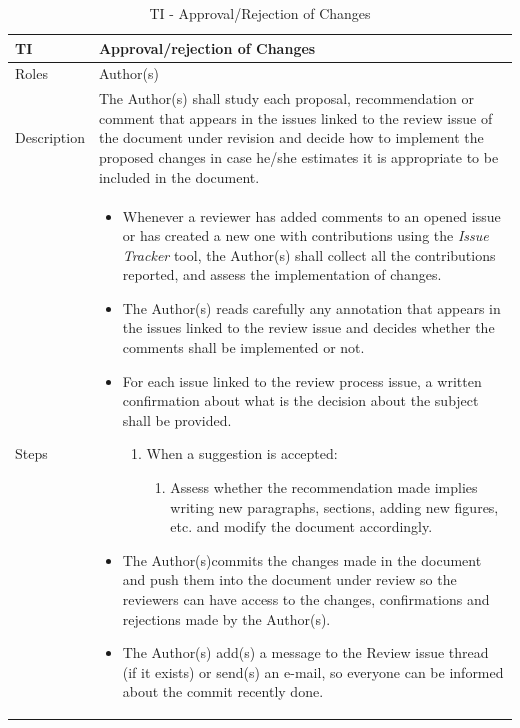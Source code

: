 \documentclass{template/openetcs_article}
\begin{document}
\begin{table}[H]
\begin{tabular}{|m{2cm}|m{12cm}|}
\hline
\rowcolor{myblue}
TI & 
Approval/rejection of Changes
\\\hline
Roles &
Author(s)
\\\hline
Description &
The Author(s) shall study each proposal, recommendation or comment that appears in the issues linked to the review issue of the document under revision and decide how to implement the proposed changes in case he/she estimates it is appropriate to be included in the document. 
\\\hline
Steps &
\begin{itemize}
\item Whenever a reviewer has added comments to an opened issue or has created a new one with contributions using the {\it Issue Tracker} tool, the Author(s) shall collect all the contributions reported, and assess the implementation of changes. 
\item The Author(s) reads carefully any annotation that appears in the issues linked to the review issue and decides whether the comments shall be implemented or not.
\item For each issue linked to the review process issue, a written confirmation about what is the decision about the subject shall be provided. 
\begin{enumerate}
\item When a suggestion is accepted:
\begin{enumerate}
\item Assess whether the recommendation made implies writing new paragraphs, sections, adding new figures, etc. and modify the document accordingly. 
\end{enumerate}
\end{enumerate}
\item The Author(s)commits the changes made in the document and push them into the document under review so the reviewers can have access to the changes, confirmations and rejections made by the Author(s).
\item The Author(s) add(s) a message to the Review issue thread (if it exists) or send(s) an e-mail, so everyone can be informed about the commit recently done. 
\end{itemize}
\\\hline
\end{tabular}
\caption{TI - Approval/Rejection of Changes}
\end{table}
\end{document}
